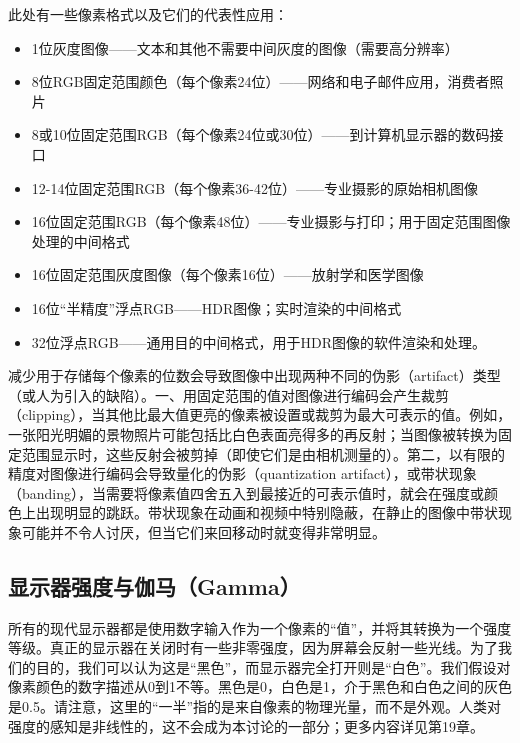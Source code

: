 \documentclass[lang=cn,12pt,marginpar=margintrue]{elegantbook}
\begin{document}

此处有一些像素格式以及它们的代表性应用：
\begin{itemize}
  \item 1位灰度图像——文本和其他不需要中间灰度的图像（需要高分辨率）
  \item 8位RGB固定范围颜色（每个像素24位）——网络和电子邮件应用，消费者照片
  \item 8或10位固定范围RGB（每个像素24位或30位）——到计算机显示器的数码接口
  \item 12-14位固定范围RGB（每个像素36-42位）——专业摄影的原始相机图像
  \item 16位固定范围RGB（每个像素48位）——专业摄影与打印；用于固定范围图像处理的中间格式
  \item 16位固定范围灰度图像（每个像素16位）——放射学和医学图像
  \item 16位“半精度”浮点RGB——HDR图像；实时渲染的中间格式
  \item 32位浮点RGB——通用目的中间格式，用于HDR图像的软件渲染和处理。
\end{itemize}

减少用于存储每个像素的位数会导致图像中出现两种不同的伪影（artifact）类型（或人为引入的缺陷）。一、用固定范围的值对图像进行编码会产生裁剪（clipping），当其他比最大值更亮的像素被设置或裁剪为最大可表示的值。例如，一张阳光明媚的景物照片可能包括比白色表面亮得多的再反射；当图像被转换为固定范围显示时，这些反射会被剪掉（即使它们是由相机测量的）。第二，以有限的精度对图像进行编码会导致量化的伪影（quantization artifact），或带状现象（banding），当需要将像素值四舍五入到最接近的可表示值时，就会在强度或颜色上出现明显的跳跃。带状现象在动画和视频中特别隐蔽，在静止的图像中带状现象可能并不令人讨厌，但当它们来回移动时就变得非常明显。

\subsection{显示器强度与伽马（Gamma）}

所有的现代显示器都是使用数字输入作为一个像素的“值”，并将其转换为一个强度等级。真正的显示器在关闭时有一些非零强度，因为屏幕会反射一些光线。为了我们的目的，我们可以认为这是“黑色”，而显示器完全打开则是“白色”。我们假设对像素颜色的数字描述从0到1不等。黑色是0，白色是1，介于黑色和白色之间的灰色是0.5。请注意，这里的“一半”指的是来自像素的物理光量，而不是外观。人类对强度的感知是非线性的，这不会成为本讨论的一部分；更多内容详见第19章。
\end{document}
